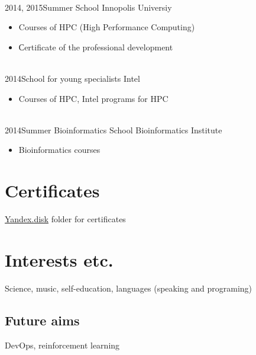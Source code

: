 \documentclass[letterpaper]{twentysecondcv} %
\begin{document}
\begin{twenty}
{{\begin{itemize}
            \end{itemize}}
        }
        \\
        \twentyitem
        {2014, 2015}{}{Summer School}
        {Innopolis Universiy}
        {}
        {
        {\begin{itemize}
            \item Courses of HPC (High Performance Computing)
            \item Сertificate of the professional development
        \end{itemize}}
        }
        \\
        \twentyitem
        {2014}{}{School for young specialists}
        {Intel}{}
        {
        {\begin{itemize}
            \item Courses of HPC, Intel programs for HPC
        \end{itemize}}
        }
        \\
        \twentyitem
        {2014}{}{Summer Bioinformatics School}
        {Bioinformatics Institute}{}
        {
        {\begin{itemize}
            \item Bioinformatics courses
        \end{itemize}}
        }
\end{twenty}



\section{Certificates}

\href{https://yadi.sk/d/aSyzcZ44-_l-8w?w=1}{Yandex.disk} folder for certificates

\section{Interests etc.}

Science, music, self-education, languages (speaking and programing)

\subsection{Future aims}

DevOps, reinforcement learning
\end{document}
